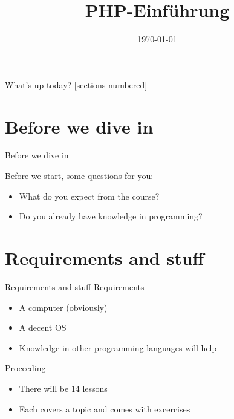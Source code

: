 


\newcommand{\topic}{
	PHP-Einführung
}

\title{\topic}
\date{\today}



\maketitle

\begin{frame}{What's up today?}
	[sections numbered]
	\tableofcontents
\end{frame}

\section{Before we dive in}

\begin{frame}{Before we dive in}

	Before we start, some questions for you:
	\pause
	\begin{itemize}
        \item What do you expect from the course? 	\pause
		\item Do you already have knowledge in programming?
	\end{itemize}
\end{frame}


\section{Requirements and stuff}

\begin{frame}{Requirements and stuff}
	Requirements

	\begin{itemize}
        \item A computer (obviously) 	\pause
		\item A decent OS 	\pause
		\item Knowledge in other programming languages will help 	\pause
	\end{itemize}
	Proceeding

	\begin{itemize}
		\item There will be 14 lessons
		\item Each covers a topic and comes with excercises
	\end{itemize}
\end{frame}

